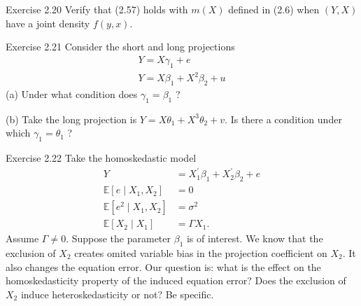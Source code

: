 \documentclass[10pt]{article}
\begin{document}
Exercise 2.20 Verify that (2.57) holds with $m(X)$ defined in (2.6) when $(Y, X)$ have a joint density $f(y, x)$.

Exercise 2.21 Consider the short and long projections
$$
\begin{gathered}
Y=X \gamma_{1}+e \\
Y=X \beta_{1}+X^{2} \beta_{2}+u
\end{gathered}
$$
(a) Under what condition does $\gamma_{1}=\beta_{1}$ ?

(b) Take the long projection is $Y=X \theta_{1}+X^{3} \theta_{2}+v$. Is there a condition under which $\gamma_{1}=\theta_{1}$ ?

Exercise 2.22 Take the homoskedastic model
$$
\begin{aligned}
Y &=X_{1}^{\prime} \beta_{1}+X_{2}^{\prime} \beta_{2}+e \\
\mathbb{E}\left[e \mid X_{1}, X_{2}\right] &=0 \\
\mathbb{E}\left[e^{2} \mid X_{1}, X_{2}\right] &=\sigma^{2} \\
\mathbb{E}\left[X_{2} \mid X_{1}\right] &=\Gamma X_{1} .
\end{aligned}
$$
Assume $\Gamma \neq 0$. Suppose the parameter $\beta_{1}$ is of interest. We know that the exclusion of $X_{2}$ creates omited variable bias in the projection coefficient on $X_{2}$. It also changes the equation error. Our question is: what is the effect on the homoskedasticity property of the induced equation error? Does the exclusion of $X_{2}$ induce heteroskedasticity or not? Be specific.
\end{document}

